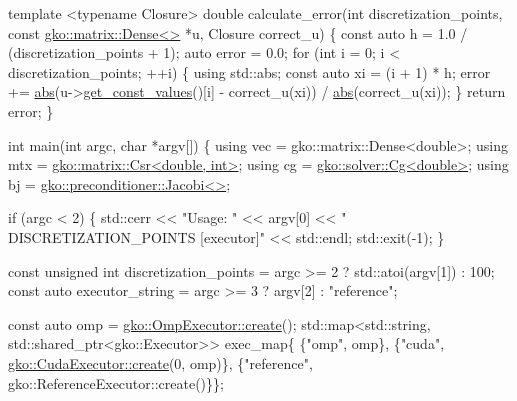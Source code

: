 \begin{DoxyCodeInclude}
\textcolor{keyword}{template} <\textcolor{keyword}{typename} Closure>
\textcolor{keywordtype}{double} calculate\_error(\textcolor{keywordtype}{int} discretization\_points, \textcolor{keyword}{const} \hyperlink{classgko_1_1matrix_1_1Dense}{gko::matrix::Dense<>} *u,
                       Closure correct\_u)
\{
    \textcolor{keyword}{const} \textcolor{keyword}{auto} h = 1.0 / (discretization\_points + 1);
    \textcolor{keyword}{auto} error = 0.0;
    \textcolor{keywordflow}{for} (\textcolor{keywordtype}{int} i = 0; i < discretization\_points; ++i) \{
        \textcolor{keyword}{using} std::abs;
        \textcolor{keyword}{const} \textcolor{keyword}{auto} xi = (i + 1) * h;
        error +=
            \hyperlink{namespacegko_a57797fc0a00fd4b7ff34ca4bfc84bc51}{abs}(u->\hyperlink{classgko_1_1matrix_1_1Dense_ab83c739c1b11abaecc3bfd89506f6c9c}{get\_const\_values}()[i] - correct\_u(xi)) / 
      \hyperlink{namespacegko_a57797fc0a00fd4b7ff34ca4bfc84bc51}{abs}(correct\_u(xi));
    \}
    \textcolor{keywordflow}{return} error;
\}


\textcolor{keywordtype}{int} main(\textcolor{keywordtype}{int} argc, \textcolor{keywordtype}{char} *argv[])
\{
    \textcolor{keyword}{using} vec = gko::matrix::Dense<double>;
    \textcolor{keyword}{using} mtx = \hyperlink{classgko_1_1matrix_1_1Csr}{gko::matrix::Csr<double, int>};
    \textcolor{keyword}{using} cg = \hyperlink{classgko_1_1solver_1_1Cg}{gko::solver::Cg<double>};
    \textcolor{keyword}{using} bj = \hyperlink{classgko_1_1preconditioner_1_1Jacobi}{gko::preconditioner::Jacobi<>};

    \textcolor{keywordflow}{if} (argc < 2) \{
        std::cerr << \textcolor{stringliteral}{"Usage: "} << argv[0] << \textcolor{stringliteral}{" DISCRETIZATION\_POINTS [executor]"}
                  << std::endl;
        std::exit(-1);
    \}

    \textcolor{keyword}{const} \textcolor{keywordtype}{unsigned} \textcolor{keywordtype}{int} discretization\_points =
        argc >= 2 ? std::atoi(argv[1]) : 100;
    \textcolor{keyword}{const} \textcolor{keyword}{auto} executor\_string = argc >= 3 ? argv[2] : \textcolor{stringliteral}{"reference"};

    \textcolor{keyword}{const} \textcolor{keyword}{auto} omp = \hyperlink{classgko_1_1OmpExecutor_a33ca05fdd0fc928ee262fc9425304874}{gko::OmpExecutor::create}();
    std::map<std::string, std::shared\_ptr<gko::Executor>> exec\_map\{
        \{\textcolor{stringliteral}{"omp"}, omp\},
        \{\textcolor{stringliteral}{"cuda"}, \hyperlink{classgko_1_1CudaExecutor_a2718a92034350650ef406ffdb60db090}{gko::CudaExecutor::create}(0, omp)\},
        \{\textcolor{stringliteral}{"reference"}, gko::ReferenceExecutor::create()\}\};


\end{DoxyCodeInclude}
